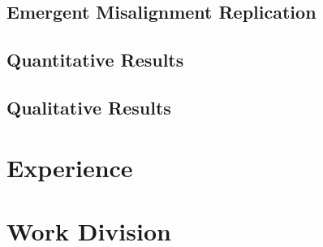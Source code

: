 \documentclass[10pt,onecolumn,letterpaper]{article}
\begin{document}
\subsection{Emergent Misalignment Replication}
\subsection{Quantitative Results}
\subsection{Qualitative Results}
\section{Experience}
\section{Work Division}



{\small


}
\end{document}
